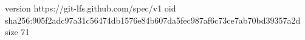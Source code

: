 version https://git-lfs.github.com/spec/v1
oid sha256:905f2adc97a31c56474db1576e84b607da5fec987af6c73ce7ab70bd39357a2d
size 71
